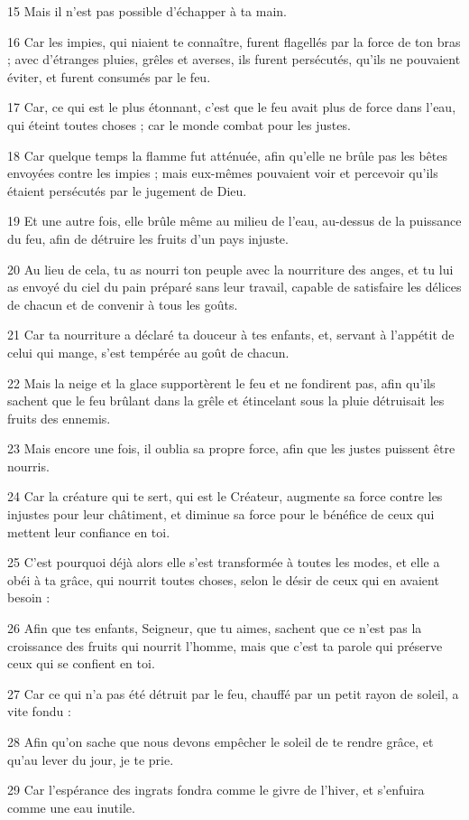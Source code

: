 \par 15 Mais il n'est pas possible d'échapper à ta main.
\par 16 Car les impies, qui niaient te connaître, furent flagellés par la force de ton bras ; avec d'étranges pluies, grêles et averses, ils furent persécutés, qu'ils ne pouvaient éviter, et furent consumés par le feu.
\par 17 Car, ce qui est le plus étonnant, c'est que le feu avait plus de force dans l'eau, qui éteint toutes choses ; car le monde combat pour les justes.
\par 18 Car quelque temps la flamme fut atténuée, afin qu'elle ne brûle pas les bêtes envoyées contre les impies ; mais eux-mêmes pouvaient voir et percevoir qu'ils étaient persécutés par le jugement de Dieu.
\par 19 Et une autre fois, elle brûle même au milieu de l'eau, au-dessus de la puissance du feu, afin de détruire les fruits d'un pays injuste.
\par 20 Au lieu de cela, tu as nourri ton peuple avec la nourriture des anges, et tu lui as envoyé du ciel du pain préparé sans leur travail, capable de satisfaire les délices de chacun et de convenir à tous les goûts.
\par 21 Car ta nourriture a déclaré ta douceur à tes enfants, et, servant à l'appétit de celui qui mange, s'est tempérée au goût de chacun.
\par 22 Mais la neige et la glace supportèrent le feu et ne fondirent pas, afin qu'ils sachent que le feu brûlant dans la grêle et étincelant sous la pluie détruisait les fruits des ennemis.
\par 23 Mais encore une fois, il oublia sa propre force, afin que les justes puissent être nourris.
\par 24 Car la créature qui te sert, qui est le Créateur, augmente sa force contre les injustes pour leur châtiment, et diminue sa force pour le bénéfice de ceux qui mettent leur confiance en toi.
\par 25 C'est pourquoi déjà alors elle s'est transformée à toutes les modes, et elle a obéi à ta grâce, qui nourrit toutes choses, selon le désir de ceux qui en avaient besoin :
\par 26 Afin que tes enfants, Seigneur, que tu aimes, sachent que ce n'est pas la croissance des fruits qui nourrit l'homme, mais que c'est ta parole qui préserve ceux qui se confient en toi.
\par 27 Car ce qui n'a pas été détruit par le feu, chauffé par un petit rayon de soleil, a vite fondu :
\par 28 Afin qu'on sache que nous devons empêcher le soleil de te rendre grâce, et qu'au lever du jour, je te prie.
\par 29 Car l'espérance des ingrats fondra comme le givre de l'hiver, et s'enfuira comme une eau inutile.

